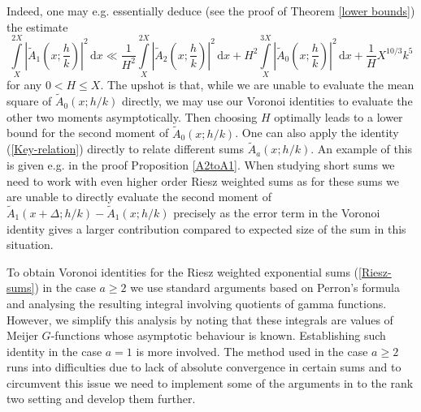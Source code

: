 \documentclass[a4paper,10pt,twoside]{amsart}
\theoremstyle{definition}
\numberwithin{equation}{section}
\renewcommand\:{\colon}
\begin{document}
Indeed, one may e.g. essentially deduce (see the proof of Theorem \ref{lower bounds}) the estimate
\[ 
\int\limits_X^{2X}\left|\widetilde A_1\left(x;\frac hk\right)\right|^2\,\mathrm d x\ll \frac1{H^2}\int\limits_X^{2X}\left|\widetilde A_2\left(x;\frac hk\right)\right|^2\,\mathrm d x+H^2\int\limits_X^{3X}\left|\widetilde A_0\left(x;\frac hk\right)\right|^2\,\mathrm d x+\frac1H X^{10/3}k^5\]
for any $0<H\leq X$. The upshot is that, while we are unable to evaluate the mean square of $\widetilde A_0(x;h/k)$ directly, we may use our Voronoi identities to evaluate the other two moments asymptotically. Then choosing $H$ optimally leads to a lower bound for the second moment of $\widetilde A_0(x;h/k)$. One can also apply the identity (\ref{Key-relation}) directly to relate different sums $\widetilde A_a(x;h/k)$. An example of this is given e.g. in the proof Proposition \ref{A2toA1}. When studying short sums we need to work with even higher order Riesz weighted sums as for these sums we are unable to directly evaluate the second moment of $\widetilde A_1(x+\Delta;h/k)-\widetilde A_1(x;h/k)$ precisely as the error term in the Voronoi identity gives a larger contribution compared to expected size of the sum in this situation. 

To obtain Voronoi identities for the Riesz weighted exponential sums (\ref{Riesz-sums}) in the case $a\geq 2$ we use standard arguments based on Perron's formula and analysing the resulting integral involving quotients of gamma functions. However, we simplify this analysis by noting that these integrals are values of Meijer $G$-functions whose asymptotic behaviour is known. Establishing such identity in the case $a=1$ is more involved. The method used in the case $a\geq 2$ runs into difficulties due to lack of absolute convergence in certain sums and to circumvent this issue we need to implement some of the arguments in \cite{Jutila} to the rank two setting and develop them further. 
\end{document}

